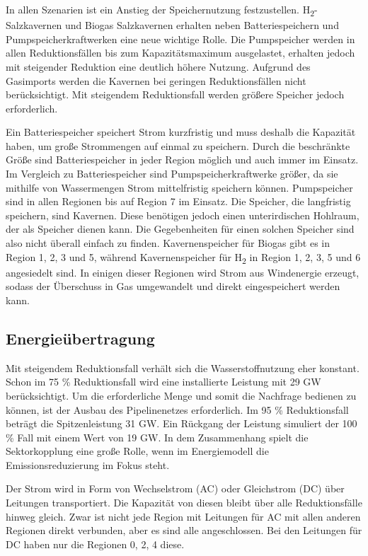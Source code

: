 In allen Szenarien ist ein Anstieg der Speichernutzung festzustellen. H\textsubscript{2}-Salzkavernen und Biogas Salzkavernen erhalten neben Batteriespeichern und Pumpspeicherkraftwerken eine neue wichtige Rolle. Die Pumpspeicher werden in allen Reduktionsfällen bis zum Kapazitätsmaximum ausgelastet, erhalten jedoch mit steigender Reduktion eine deutlich höhere Nutzung. 
Aufgrund des Gasimports werden die Kavernen bei geringen Reduktionsfällen nicht berücksichtigt. Mit steigendem Reduktionsfall werden größere Speicher jedoch erforderlich.

Ein Batteriespeicher speichert Strom kurzfristig und muss deshalb die Kapazität haben, um große Strommengen auf einmal zu speichern. Durch die beschränkte Größe sind Batteriespeicher in jeder Region möglich und auch immer im Einsatz.
Im Vergleich zu Batteriespeicher sind Pumpspeicherkraftwerke größer, da sie mithilfe von Wassermengen Strom mittelfristig speichern können. Pumpspeicher sind in allen Regionen bis auf Region 7 im Einsatz.
Die Speicher, die langfristig speichern, sind Kavernen. Diese benötigen jedoch einen unterirdischen Hohlraum, der als Speicher dienen kann. Die Gegebenheiten für einen solchen Speicher sind also nicht überall einfach zu finden. Kavernenspeicher für Biogas gibt es in Region 1, 2, 3 und 5, während Kavernenspeicher für H\textsubscript{2} in Region 1, 2, 3, 5 und 6 angesiedelt sind. In einigen dieser Regionen wird Strom aus Windenergie erzeugt, sodass der Überschuss in Gas umgewandelt und direkt eingespeichert werden kann.


\subsection{Energieübertragung}
Mit steigendem Reduktionsfall verhält sich die Wasserstoffnutzung eher konstant. Schon im 75 \% Reduktionsfall wird eine installierte Leistung mit 29 GW berücksichtigt. Um die erforderliche Menge und somit die Nachfrage bedienen zu können, ist der Ausbau des Pipelinenetzes erforderlich. Im 95 \% Reduktionsfall beträgt die Spitzenleistung 31 GW. Ein Rückgang der Leistung simuliert der 100 \% Fall mit einem Wert von 19 GW. In dem Zusammenhang spielt die Sektorkopplung eine große Rolle, wenn im Energiemodell die Emissionsreduzierung im Fokus steht. 

Der Strom wird in Form von Wechselstrom (AC) oder Gleichstrom (DC) über Leitungen transportiert. Die Kapazität von diesen bleibt über alle Reduktionsfälle hinweg gleich. Zwar ist nicht jede Region mit Leitungen für AC mit allen anderen Regionen direkt verbunden, aber es sind alle angeschlossen. Bei den Leitungen für DC haben nur die Regionen 0, 2, 4 diese.

